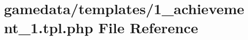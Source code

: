 \hypertarget{1__achievement__1_8tpl_8php}{\section{gamedata/templates/1\+\_\+achievement\+\_\+1.tpl.\+php File Reference}
\label{1__achievement__1_8tpl_8php}
}
